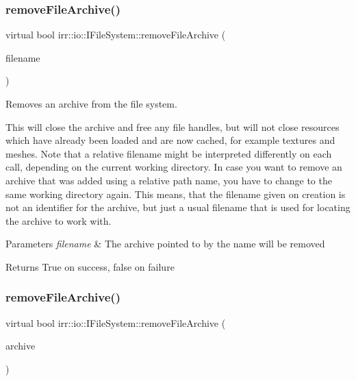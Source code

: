 \subsubsection{\texorpdfstring{remove\+File\+Archive()}{removeFileArchive()}\hspace{0.1cm}{\footnotesize\ttfamily [4/6]}}
{\footnotesize\ttfamily virtual bool irr\+::io\+::\+I\+File\+System\+::remove\+File\+Archive (\begin{DoxyParamCaption}\item[{const \hyperlink{namespaceirr_1_1io_a6468281622ce3a1c46b72e19f32dded5}{path} \&}]{filename }\end{DoxyParamCaption})\hspace{0.3cm}{\ttfamily [pure virtual]}}



Removes an archive from the file system. 

This will close the archive and free any file handles, but will not close resources which have already been loaded and are now cached, for example textures and meshes. Note that a relative filename might be interpreted differently on each call, depending on the current working directory. In case you want to remove an archive that was added using a relative path name, you have to change to the same working directory again. This means, that the filename given on creation is not an identifier for the archive, but just a usual filename that is used for locating the archive to work with. 
\begin{DoxyParams}{Parameters}
{\em filename} & The archive pointed to by the name will be removed \\
\hline
\end{DoxyParams}
\begin{DoxyReturn}{Returns}
True on success, false on failure 
\end{DoxyReturn}
\mbox{\label{classirr_1_1io_1_1IFileSystem_ab7579f5ccca7bc7c1e079f5cb38173ed}} 
\subsubsection{\texorpdfstring{remove\+File\+Archive()}{removeFileArchive()}\hspace{0.1cm}{\footnotesize\ttfamily [5/6]}}
{\footnotesize\ttfamily virtual bool irr\+::io\+::\+I\+File\+System\+::remove\+File\+Archive (\begin{DoxyParamCaption}\item[{const \hyperlink{classirr_1_1io_1_1IFileArchive}{I\+File\+Archive} $\ast$}]{archive }\end{DoxyParamCaption})\hspace{0.3cm}{\ttfamily [pure virtual]}}



